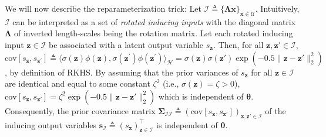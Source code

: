 \documentclass[conference]{IEEEtran}
\begin{document}
We will now describe the reparameterization trick: 
Let $\mathcal{I}\triangleq\{\mathbf{\Lambda}\mathbf{x}\}_{\mathbf{x} \in \mathcal{U}}$.
Intuitively, $\mathcal{I}$ can be interpreted as a set of \emph{rotated inducing inputs} with the diagonal matrix $\mathbf{\Lambda}$ of inverted length-scales being the rotation matrix. 
%
%
Let each rotated inducing input $\mathbf{z} \in \mathcal{I}$ be associated with a latent output variable $s_{\mathbf{z}}$. 
Then, for all $\mathbf{z},\mathbf{z}' \in \mathcal{I}$,  
$\text{cov}[s_{\mathbf{z}}, s_{\mathbf{z}'}] \triangleq \langle \sigma(\mathbf{z})\phi(\mathbf{z}), \sigma(\mathbf{z}^\prime)\phi(\mathbf{z}^\prime) \rangle_{\mathcal{H}} = \sigma(\mathbf{z})\sigma(\mathbf{z}')\exp(-0.5\|\mathbf{z} - \mathbf{z}'\|_2^2)$, by definition of RKHS. 
By assuming that the prior variances of $s_\mathbf{z}$ for all $\mathbf{z}\in\mathcal{I}$ are identical 
and equal to some constant $\zeta^2$ (i.e., $\sigma(\mathbf{z}) = \zeta > 0$), \textcolor{black}{$\text{cov}[s_{\mathbf{z}}, s_{\mathbf{z}'}] = \zeta^2\exp(-0.5\|\mathbf{z} - \mathbf{z}'\|_2^2)$} which is independent of $\boldsymbol{\theta}$. Consequently, the prior covariance matrix $\mathbf{\Sigma}_\mathcal{II} \triangleq (\text{cov}[s_{\mathbf{z}}, s_{\mathbf{z}'}])_{\mathbf{z},\mathbf{z}' \in \mathcal{I}}$ of the inducing output variables $\mathbf{s}_\mathcal{I} \triangleq (s_{\mathbf{z}})^\top_{\mathbf{z}\in\mathcal{I}}$ is independent of $\boldsymbol{\theta}$. %
\end{document}

